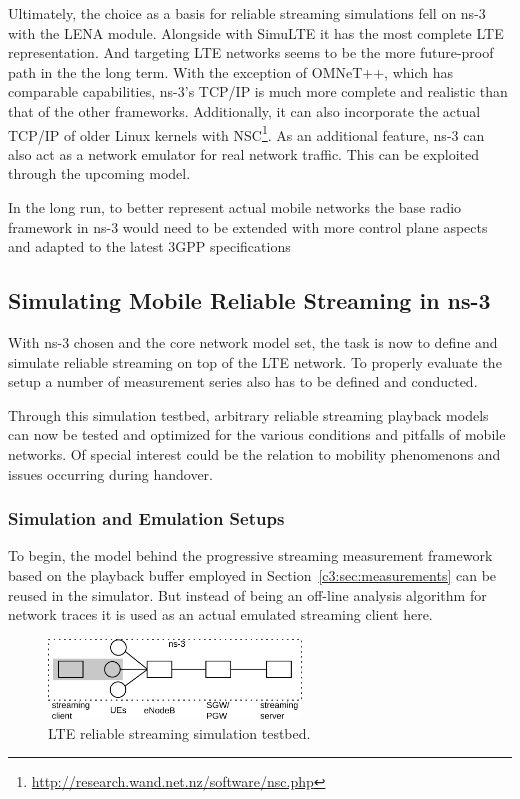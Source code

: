 Ultimately, the choice as a basis for reliable streaming simulations fell on ns-3 with the LENA module. Alongside with SimuLTE it has the most complete \gls{LTE} representation. And targeting \gls{LTE} networks seems to be the more future-proof path in the the long term. With the exception of OMNeT++, which has comparable capabilities, ns-3's \gls{TCP}/\gls{IP} is much more complete and realistic than that of the other frameworks. Additionally, it can also incorporate the actual \gls{TCP}/\gls{IP} of older Linux kernels with NSC\footnote{\url{http://research.wand.net.nz/software/nsc.php}}. As an additional feature, ns-3 can also act as a network emulator for real network traffic. This can be exploited through the upcoming model.

In the long run, to better represent actual mobile networks the base radio framework in ns-3 would need to be extended with more control plane aspects and adapted to the latest \gls{3GPP} specifications


\subsection{Simulating Mobile Reliable Streaming in ns-3}

With ns-3 chosen and the core network model set, the task is now to define and simulate reliable streaming on top of the \gls{LTE} network. To properly evaluate the setup a number of measurement series also has to be defined and conducted.

Through this simulation testbed, arbitrary reliable streaming playback models can now be tested and optimized for the various conditions and pitfalls of mobile networks. Of special interest could be the relation to mobility phenomenons and issues occurring during handover.


\subsubsection{Simulation and Emulation Setups}

To begin, the model behind the progressive streaming measurement framework based on the playback buffer employed in Section~\ref{c3:sec:measurements} can be reused in the simulator. But instead of being an off-line analysis algorithm for network traces it is used as an actual emulated streaming client here.

\begin{figure}[htb]
	\centering
	\includegraphics[width=0.6\textwidth]{images/streaming-simulation.pdf}
	\caption{\acrshort{LTE} reliable streaming simulation testbed.}
\label{c6:fig:streaming-simulation}
\end{figure}

